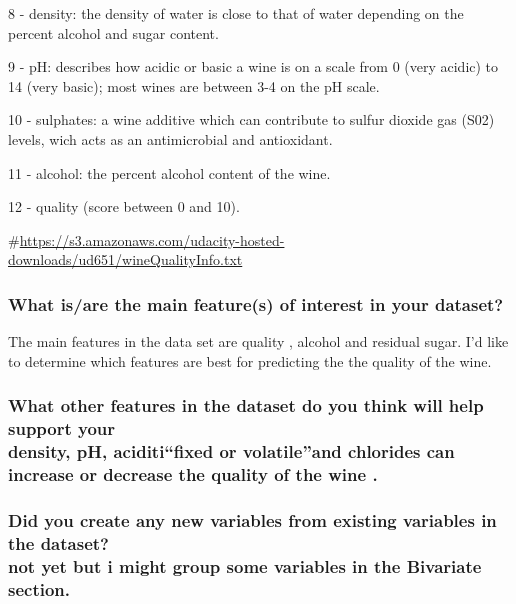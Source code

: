 \documentclass[]{article}
\begin{document}
8 - density: the density of water is close to that of water depending on
the percent alcohol and sugar content.

9 - pH: describes how acidic or basic a wine is on a scale from 0 (very
acidic) to 14 (very basic); most wines are between 3-4 on the pH scale.

10 - sulphates: a wine additive which can contribute to sulfur dioxide
gas (S02) levels, wich acts as an antimicrobial and antioxidant.

11 - alcohol: the percent alcohol content of the wine.

12 - quality (score between 0 and 10).

\#\url{https://s3.amazonaws.com/udacity-hosted-downloads/ud651/wineQualityInfo.txt}

\subsubsection{What is/are the main feature(s) of interest in your
dataset?}\label{what-isare-the-main-features-of-interest-in-your-dataset}

The main features in the data set are quality , alcohol and residual
sugar. I'd like to determine which features are best for predicting the
the quality of the wine.

\subsubsection{\texorpdfstring{What other features in the dataset do you
think will help support your\\
density, pH, aciditi``fixed or volatile''and chlorides can increase or
decrease the quality of the wine
.}{What other features in the dataset do you think will help support your density, pH, aciditifixed or volatileand chlorides can increase or decrease the quality of the wine .}}\label{what-other-features-in-the-dataset-do-you-think-will-help-support-your-density-ph-aciditifixed-or-volatileand-chlorides-can-increase-or-decrease-the-quality-of-the-wine-.}

\subsubsection{\texorpdfstring{Did you create any new variables from
existing variables in the dataset?\\
not yet but i might group some variables in the Bivariate
section.}{Did you create any new variables from existing variables in the dataset? not yet but i might group some variables in the Bivariate section.}}\label{did-you-create-any-new-variables-from-existing-variables-in-the-dataset-not-yet-but-i-might-group-some-variables-in-the-bivariate-section.}
\end{document}
